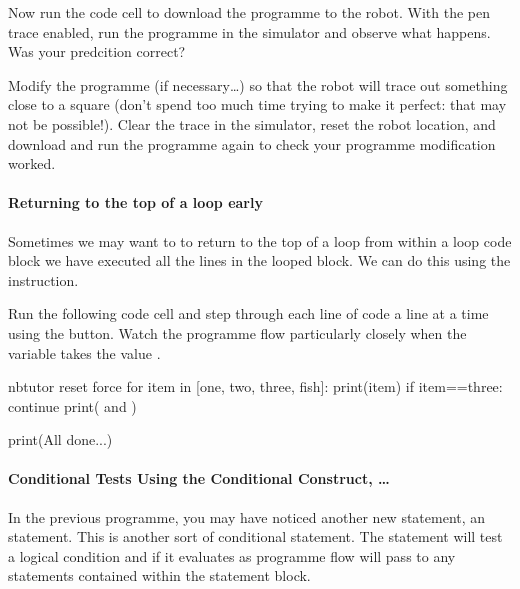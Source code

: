 \documentclass[letterpaper,10pt,english]{sphinxmanual}
\begin{document}
{{\begin{sphinxVerbatim}[commandchars=\\\{\}]
\end{sphinxVerbatim}
}

Now run the code cell to download the programme to the robot. With the pen trace enabled, run the programme in the simulator and observe what happens. Was your predcition correct?

Modify the programme (if necessary…) so that the robot will trace out something close to a square (don’t spend too much time trying to make it perfect: that may not be possible!). Clear the trace in the simulator, reset the robot location, and download and run the programme again to check your programme modification worked.


\paragraph{Returning to the top of a loop early}
\label{\detokenize{content/02_Robot_Lab/Section_00_01:Returning-to-the-top-of-a-loop-early}}
Sometimes we may want to to return to the top of a loop from within a loop code block  we have executed all the lines in the looped block. We can do this using the  instruction.

Run the following code cell and step through each line of code a line at a time using the   button. Watch the programme flow particularly closely when the  variable takes the value .

{
\begin{sphinxVerbatim}[commandchars=\\\{\}]
\llap{\color{nbsphinxin}[ ]:\,\hspace{\fboxrule}\hspace{\fboxsep}}\PYGZpc{}\PYGZpc{}nbtutor \PYGZhy{}\PYGZhy{}reset \PYGZhy{}\PYGZhy{}force
for item in [\PYGZsq{}one\PYGZsq{}, \PYGZsq{}two\PYGZsq{}, \PYGZsq{}three\PYGZsq{}, \PYGZsq{}fish\PYGZsq{}]:
    print(item)
    if item==\PYGZsq{}three\PYGZsq{}:
        continue
    print(\PYGZsq{} and \PYGZsq{})

print(\PYGZsq{}All done...\PYGZsq{})
\end{sphinxVerbatim}
}


\paragraph{Conditional Tests Using the Conditional Construct, …}
\label{\detokenize{content/02_Robot_Lab/Section_00_01:Conditional-Tests-Using-the-Conditional-Construct,-if_u2026}}
In the previous programme, you may have noticed another new statement, an  statement. This is another sort of conditional statement. The  statement will test a logical condition and if it evaluates as  programme flow will pass to any statements contained within the  statement block.

}
\end{document}
